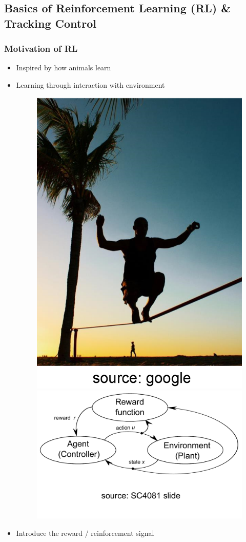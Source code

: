 \documentclass{beamer}
\begin{document}
	\subsection{Basics of Reinforcement Learning (RL) \& Tracking Control}
	\begin{frame}\frametitle{Motivation of RL}
		\begin{itemize}
			\item Inspired by how animals learn
			\pause
			\item Learning through interaction with environment
			\pause
			\begin{figure}
				\includegraphics[width=0.30\linewidth]{images/slacklining} \hspace{5mm}
				\includegraphics[width=0.60\linewidth]{images/rl_diagram}
			\end{figure}
			\pause
			\item Introduce the reward / reinforcement signal
		\end{itemize}
	\end{frame}
	
\end{document}

